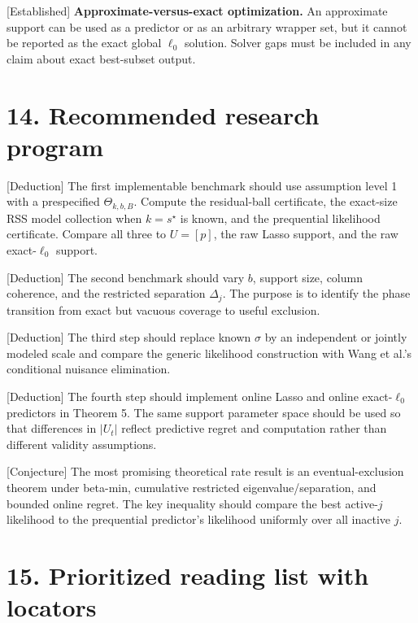 \documentclass[
  english,
  11pt,
  a4paper,
]{article}
\begin{document}
{[}Established{]} \textbf{Approximate-versus-exact optimization.} An
approximate support can be used as a predictor or as an arbitrary
wrapper set, but it cannot be reported as the exact global $\ell_0$
solution. Solver gaps must be included in any claim about exact
best-subset output.

\section{14. Recommended research
program}\label{recommended-research-program}

{[}Deduction{]} The first implementable benchmark should use assumption
level 1 with a prespecified $\Theta_{k,b,B}$. Compute the
residual-ball certificate, the exact-size RSS model collection when
$k=s^\star$ is known, and the prequential likelihood certificate.
Compare all three to $U=[p]$, the raw Lasso support, and the raw
exact-$\ell_0$ support.

{[}Deduction{]} The second benchmark should vary $b$, support size,
column coherence, and the restricted separation $\Delta_j$. The
purpose is to identify the phase transition from exact but vacuous
coverage to useful exclusion.

{[}Deduction{]} The third step should replace known $\sigma$ by an
independent or jointly modeled scale and compare the generic likelihood
construction with Wang et al.'s conditional nuisance elimination.

{[}Deduction{]} The fourth step should implement online Lasso and online
exact-$\ell_0$ predictors in Theorem 5. The same support parameter
space should be used so that differences in $|U_t|$ reflect predictive
regret and computation rather than different validity assumptions.

{[}Conjecture{]} The most promising theoretical rate result is an
eventual-exclusion theorem under beta-min, cumulative restricted
eigenvalue/separation, and bounded online regret. The key inequality
should compare the best active-$j$ likelihood to the prequential
predictor's likelihood uniformly over all inactive $j$.

\section{15. Prioritized reading list with
locators}\label{prioritized-reading-list-with-locators}
\end{document}
